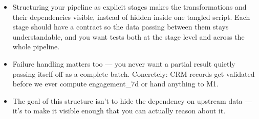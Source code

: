\documentclass[11pt,a4paper]{article}
\begin{document}
\begin{examplebox}[title after break={SPOKEN SCRIPT --- slide 29 continued}]
\begin{itemize}
\item Structuring your pipeline as explicit stages makes the transformations and their dependencies visible, instead of hidden inside one tangled script. Each stage should have a contract so the data passing between them stays understandable, and you want tests both at the stage level and across the whole pipeline.
\item Failure handling matters too — you never want a partial result quietly passing itself off as a complete batch. Concretely: CRM records get validated before we ever compute engagement\_7d or hand anything to M1.
\item The goal of this structure isn't to hide the dependency on upstream data — it's to make it visible enough that you can actually reason about it.
\end{itemize}
\end{examplebox}
\par\noindent{\scriptsize\textcolor{teal!60!black}{Reading anchor: Kalinowski, Ch. 14 · Nazir et al. (2024)}}
\clearpage
\end{document}
